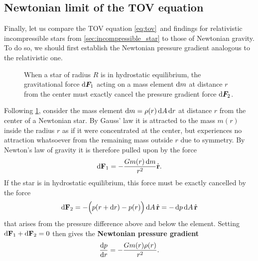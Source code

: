 \subsection{Newtonian limit of the TOV equation}

Finally, let us compare the TOV equation \eqref{eq:tov} and findings for relativistic incompressible stars from \cref{sec:incompressible_star} to those of Newtonian gravity.
To do so, we should first establish the Newtonian pressure gradient analogous to the relativistic one.

\begin{figure}
\centering
{}
\caption{\label{fig:hydrostatic_equilibrium_sphere}When a star of radius $R$ is in hydrostatic equilibrium, the gravitational force $\mathop{}\!\mathrm{d} {\bm{F}}_1$ acting on a mass element  $\mathop{}\!\mathrm{d} m$ at distance $r$ from the center must exactly cancel the pressure gradient force $\mathop{}\!\mathrm{d} {\bm{F}}_2$.}
\end{figure}

Following \cref{fig:hydrostatic_equilibrium_sphere}, consider the mass element $\mathop{}\!\mathrm{d} m = \rho(r) \mathop{}\!\mathrm{d} A \mathop{}\!\mathrm{d} r$ at distance $r$ from the center of a Newtonian star.
By Gauss' law it is attracted to the mass $m(r)$ inside the radius $r$ as if it were concentrated at the center, but experiences no attraction whatsoever from the remaining mass outside $r$ due to symmetry.
By Newton's law of gravity it is therefore pulled upon by the force
\begin{equation}
	\mathop{}\!\mathrm{d} \mathbf{F}_1 = -\frac{G m(r) \mathop{}\!\mathrm{d} m}{r^2} \hat{\textbf{r}} .
	\label{eq:weak_field_limit:force_newton}
\end{equation}
If the star is in hydrostatic equilibrium, this force must be exactly cancelled by the force
\begin{equation}
	\mathop{}\!\mathrm{d} \textbf{F}_2 = - \Big( p(r + \mathop{}\!\mathrm{d} r) - p(r) \Big) \mathop{}\!\mathrm{d} A \, \hat{\textbf{r}} = -\mathop{}\!\mathrm{d} p \mathop{}\!\mathrm{d} A \, \hat{\textbf{r}}
	\label{eq:weak_field_limit:force_pressure}
\end{equation}
that arises from the pressure difference above and below the element.
Setting $\mathop{}\!\mathrm{d} \textbf{F}_1 + \mathop{}\!\mathrm{d} \textbf{F}_2 = 0$ then gives the \textbf{Newtonian pressure gradient}
\begin{equation}
	\odv{p}{r} = -\frac{G m(r) \rho(r)}{r^2} .
	\label{eq:weak_field_limit:newtonian_pressure_gradient}
\end{equation}

